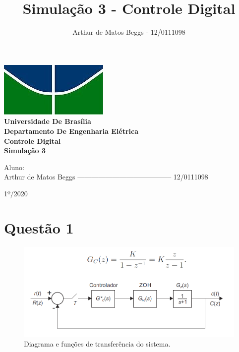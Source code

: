 \documentclass{article}
\title{Simulação 3 - Controle Digital}
\author{Arthur de Matos Beggs - 12/0111098}
\date{}
\begin{document}

\begin{titlepage}
    \begin{center}
        \centering
        \includegraphics[width=.5\linewidth]{images/LogoUnB.jpg}\\[0.1cm]
        {\large \textbf{Universidade De Brasília}}\\[0.2cm]
        {\large \textbf{Departamento De Engenharia Elétrica}}\\[0.2cm]
        {\large \textbf{Controle Digital}}\\[5.1cm]
        {\bf \huge Simulação 3}\\[5.1cm]
    \end{center}
{\large Aluno: \\    Arthur de Matos Beggs ----------------------------------------- 12/0111098 }
\vspace{7mm}
    \begin{center}
        {\large 1º/2020}
    \end{center}
\end{titlepage}

\clearpage %

\setcounter{page}{2}


\section{Questão 1}

    \begin{figure}[H]
       \centering
            \includegraphics[width=1\linewidth]{images/Diagrama.png}
            \caption{Diagrama e funções de transferência do sistema.}
            \label{fig:diagram}
    \end{figure}
\end{document}
